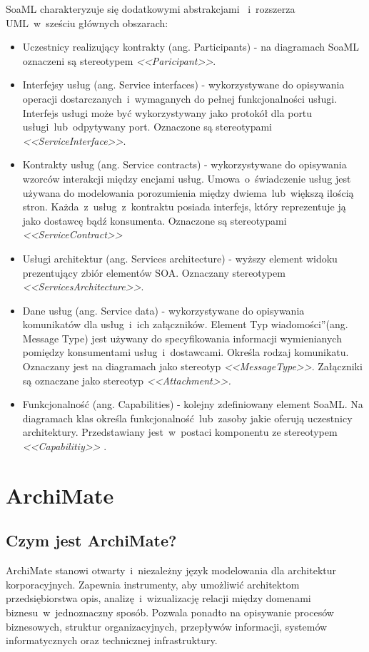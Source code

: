 SoaML charakteryzuje się dodatkowymi abstrakcjami \cite{PlatIntGor}~i~rozszerza UML~w~sześciu głównych obszarach: 
\begin{itemize}
\item{Uczestnicy realizujący kontrakty (ang. Participants) - na diagramach SoaML oznaczeni są stereotypem \emph{<<Paricipant>>}.}
\item{Interfejsy usług (ang. Service interfaces) - wykorzystywane do opisywania operacji dostarczanych~i~wymaganych do pełnej funkcjonalności usługi. Interfejs usługi może być wykorzystywany jako protokół dla portu usługi~lub~odpytywany port. Oznaczone są stereotypami \emph{<<ServiceInterface>>}.}
\item{Kontrakty usług (ang. Service contracts) - wykorzystywane do opisywania wzorców interakcji między encjami usług. Umowa~o~świadczenie usług jest używana do modelowania porozumienia między dwiema~lub~większą ilością stron. Każda~z~usług~z~kontraktu posiada interfejs, który reprezentuje ją jako dostawcę bądź konsumenta. Oznaczone są stereotypami \emph{<<ServiceContract>>}}
\item{Usługi architektur (ang. Services architecture) - wyższy element widoku prezentujący zbiór elementów SOA. Oznaczany stereotypem \emph{<<ServicesArchitecture>>}.}
\item{Dane usług (ang. Service data) - wykorzystywane do opisywania komunikatów dla usług~i~ich załączników. Element \quotedblbase Typ wiadomości\textquotedblright (ang. Message Type) jest używany do specyfikowania informacji wymienianych pomiędzy konsumentami usług~i~dostawcami. Określa rodzaj komunikatu. Oznaczany jest na diagramach jako stereotyp \emph{<<MessageType>>}. Załączniki są oznaczane jako stereotyp \emph{<<Attachment>>.}}
\item{Funkcjonalność (ang. Capabilities) - kolejny zdefiniowany element SoaML. Na diagramach klas określa funkcjonalność~lub~zasoby jakie oferują uczestnicy architektury. Przedstawiany jest~w~postaci komponentu ze stereotypem \emph{<<Capabilitiy>>} \cite{SoaMLErvBase}.}
\end{itemize} 


\section{ArchiMate}
\subsection{Czym jest ArchiMate?}
ArchiMate stanowi otwarty~i~niezależny język modelowania dla architektur korporacyjnych. Zapewnia instrumenty, aby umożliwić architektom przedsiębiorstwa opis, analizę~i~wizualizację relacji między domenami biznesu~w~jednoznaczny sposób. Pozwala ponadto na opisywanie procesów biznesowych, struktur organizacyjnych, przepływów informacji, systemów informatycznych oraz technicznej infrastruktury.

